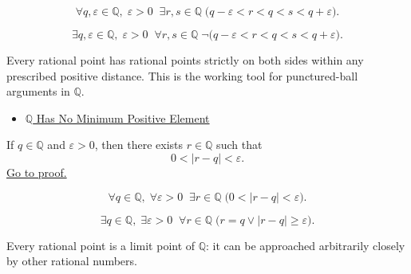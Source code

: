 \begin{remark*}
\[
\forall q,\varepsilon\in\mathbb{Q},\;\varepsilon>0\;\;
\exists r,s\in\mathbb{Q}\;
\bigl(q-\varepsilon < r < q < s < q+\varepsilon\bigr).
\]
\end{remark*}

\begin{remark*}
\[
\exists q,\varepsilon\in\mathbb{Q},\;\varepsilon>0\;\;
\forall r,s\in\mathbb{Q}\;
\neg\bigl(q-\varepsilon < r < q < s < q+\varepsilon\bigr).
\]
\end{remark*}

\begin{remark*}[Interpretation]
Every rational point has rational points strictly on both sides within any
prescribed positive distance. This is the working tool for punctured-ball
arguments in $\mathbb{Q}$.
\end{remark*}

\begin{dependencies}
\begin{itemize}
  \item \hyperref[thm:q-has-no-minimum-positive-element]{$\mathbb{Q}$ Has No Minimum Positive Element}
\end{itemize}
\end{dependencies}

\begin{lemma}
\label{lem:rational-perturbation-lemma}
If $q\in\mathbb{Q}$ and $\varepsilon>0$, then there exists $r\in\mathbb{Q}$
such that
\[
0<|r-q|<\varepsilon.
\]
\hyperref[prf:rational-perturbation-lemma]{Go to proof.}
\end{lemma}

\begin{remark*}
\[
\forall q\in\mathbb{Q},\;\forall\varepsilon>0\;\;
\exists r\in\mathbb{Q}\;
\bigl(0<|r-q|<\varepsilon\bigr).
\]
\end{remark*}

\begin{remark*}
\[
\exists q\in\mathbb{Q},\;\exists\varepsilon>0\;\;
\forall r\in\mathbb{Q}\;
\bigl(r=q \lor |r-q|\ge\varepsilon\bigr).
\]
\end{remark*}

\begin{remark*}[Interpretation]
Every rational point is a limit point of $\mathbb{Q}$: it can be approached
arbitrarily closely by other rational numbers.
\end{remark*}

